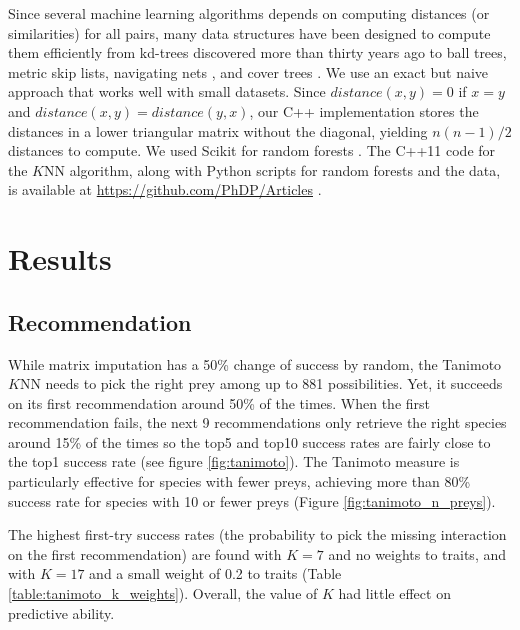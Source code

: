 \documentclass[letterpaper]{article}
\begin{document}
Since several machine learning algorithms depends on computing distances (or
similarities) for all pairs, many data structures have been designed to compute
them efficiently from kd-trees discovered more than thirty years ago
\cite{fri77} to ball trees, metric skip lists, navigating nets \cite{izb15},
and cover trees \cite{bey06,izb15}. We use an exact but naive approach that
works well with small datasets. Since $distance(x, y) = 0$ if $x = y$ and
$distance(x, y) = distance(y, x)$, our C++ implementation stores the distances
in a lower triangular matrix without the diagonal, yielding $n(n - 1)/2$
distances to compute. We used Scikit for random forests \cite{scikit-learn}.
The C++11 code for the $K$NN algorithm, along with Python scripts for random
forests and the data, is available at
\href{https://github.com/PhDP/Articles}{https://github.com/PhDP/Articles}
\cite{phd16b}.



\section{Results}

\subsection{Recommendation}

While matrix imputation has a 50\% change of success by random, the Tanimoto
$K$NN needs to pick the right prey among up to 881 possibilities. Yet, it
succeeds on its first recommendation around 50\% of the times. When the first
recommendation fails, the next 9 recommendations only retrieve the right
species around 15\% of the times so the top5 and top10 success rates are fairly
close to the top1 success rate (see figure \ref{fig:tanimoto}). The Tanimoto
measure is particularly effective for species with fewer preys, achieving more
than 80\% success rate for species with 10 or fewer preys (Figure
\ref{fig:tanimoto_n_preys}).

The highest first-try success rates (the probability to pick the missing
interaction on the first recommendation) are found with $K = 7$ and no weights
to traits, and with $K = 17$ and a small weight of 0.2 to traits (Table
\ref{table:tanimoto_k_weights}). Overall, the value of $K$ had little
effect on predictive ability.
\end{document}
